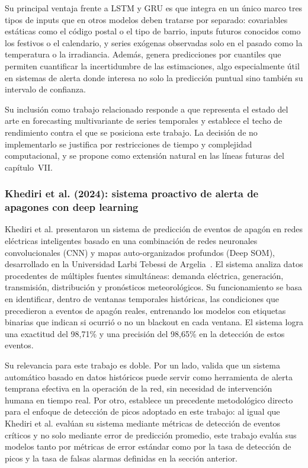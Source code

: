 \documentclass[12pt, a4paper]{article}
\begin{document}
Su principal ventaja frente a LSTM y GRU es que integra en un único marco tres tipos de inputs que en otros modelos deben tratarse por separado: covariables estáticas como el código postal o el tipo de barrio, inputs futuros conocidos como los festivos o el calendario, y series exógenas observadas solo en el pasado como la temperatura o la irradiancia. Además, genera predicciones por cuantiles que permiten cuantificar la incertidumbre de las estimaciones, algo especialmente útil en sistemas de alerta donde interesa no solo la predicción puntual sino también su intervalo de confianza.

Su inclusión como trabajo relacionado responde a que representa el estado del arte en forecasting multivariante de series temporales y establece el techo de rendimiento contra el que se posiciona este trabajo. La decisión de no implementarlo se justifica por restricciones de tiempo y complejidad computacional, y se propone como extensión natural en las líneas futuras del capítulo~VII.

\subsubsection{Khediri et al. (2024): sistema proactivo de alerta de apagones con deep learning}

Khediri et al. presentaron un sistema de predicción de eventos de apagón en redes eléctricas inteligentes basado en una combinación de redes neuronales convolucionales (CNN) y mapas auto-organizados profundos (Deep SOM), desarrollado en la Universidad Larbi Tebessi de Argelia~\cite{khediri2024}. El sistema analiza datos procedentes de múltiples fuentes simultáneas: demanda eléctrica, generación, transmisión, distribución y pronósticos meteorológicos. Su funcionamiento se basa en identificar, dentro de ventanas temporales históricas, las condiciones que precedieron a eventos de apagón reales, entrenando los modelos con etiquetas binarias que indican si ocurrió o no un blackout en cada ventana. El sistema logra una exactitud del 98,71\% y una precisión del 98,65\% en la detección de estos eventos.

Su relevancia para este trabajo es doble. Por un lado, valida que un sistema automático basado en datos históricos puede servir como herramienta de alerta temprana efectiva en la operación de la red, sin necesidad de intervención humana en tiempo real. Por otro, establece un precedente metodológico directo para el enfoque de detección de picos adoptado en este trabajo: al igual que Khediri et al. evalúan su sistema mediante métricas de detección de eventos críticos y no solo mediante error de predicción promedio, este trabajo evalúa sus modelos tanto por métricas de error estándar como por la tasa de detección de picos y la tasa de falsas alarmas definidas en la sección anterior.
\end{document}
